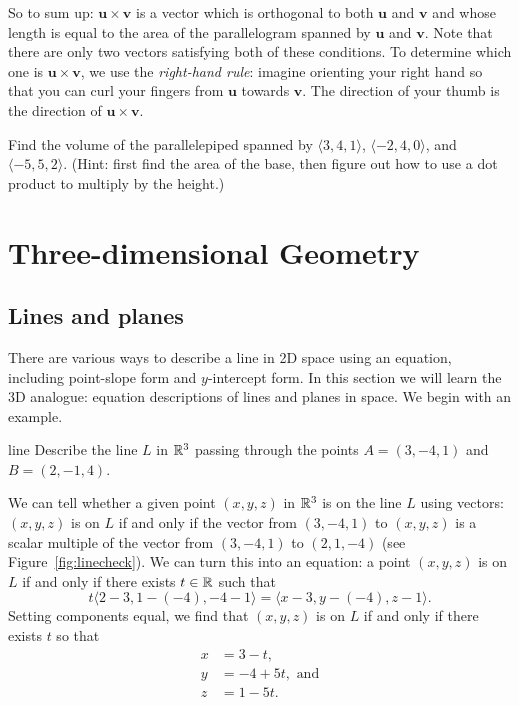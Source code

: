 \documentclass[svgnames]{report}
\begin{document}
So to sum up: $\mathbf{u}  \times \mathbf{v}$ is a vector which is
orthogonal to both $\mathbf{u}$ and $\mathbf{v}$ and whose length
is equal to the area of the parallelogram spanned by $\mathbf{u}$ and
$\mathbf{v}$. Note that there are only two vectors satisfying both of
these conditions. To determine which one is $\mathbf{u}  \times
\mathbf{v}$, we use the \textit{right-hand rule}: imagine orienting
your right hand so that you can curl your fingers from $\mathbf{u}$
towards $\mathbf{v}$. The direction of your thumb is the direction of
$\mathbf{u} \times \mathbf{v}$. 

\begin{exercise}{}{}
  Find the volume of the parallelepiped spanned by
  $\langle 3,4,1 \rangle$,  $\langle -2,4,0 \rangle$, and 
  $\langle -5,5,2 \rangle$. (Hint: first find the area of the base,
  then figure out how to use a   dot product to multiply by the height.)
\end{exercise}

\chapter{Three-dimensional Geometry}

\section{Lines and planes}
  
There are various ways to describe a line in 2D space using an
equation, including point-slope form and $y$-intercept form. In this
section we will learn the 3D analogue: equation descriptions of lines
and planes in space. We begin with an example.

\begin{example}{}{line}
  Describe the line $L$ in $\mathbb{R}^3$ passing through the points $A = (3,-4,1)$ and
$B = (2,-1,4)$. 
\end{example}

\begin{solution}
  We can tell whether a given point $(x,y,z)$ in $\mathbb{R}^3$ is on the line
  $L$ using vectors: $(x,y,z)$ is on $L$ if and only if the vector
  from $(3,-4,1)$ to $(x,y,z)$ is a scalar multiple of the vector from
  $(3,-4,1)$ to $(2,1,-4)$ (see Figure~\ref{fig:linecheck}). We can
  turn this into an equation: a point $(x,y,z)$ is on $L$ if and only
  if there exists $t\in \mathbb{R}$ such that
  \[
    t \big\langle 2-3, 1-(-4), -4-1\big\rangle = \big\langle x - 3, y -(-4), z -
    1\big\rangle. 
  \]
  Setting components equal, we find that $(x,y,z)$ is on $L$ if and
  only if there exists $t$ so that 
  \begin{align} \nonumber 
    x &= 3 - t, \\ \label{eq:par}
    y &= -4 +5t, \text{ and} \\  \nonumber 
    z &= 1 - 5t.
  \end{align}
\end{solution}
\end{document}

